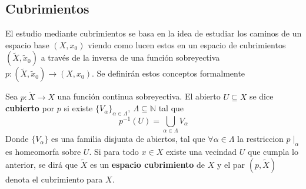 \subsection{Cubrimientos}
El estudio mediante cubrimientos se basa en la idea de estudiar los
caminos de un espacio base \((X, x_0)\) viendo como lucen estos en
un espacio de cubrimientos \((\tilde X, \tilde x_0)\) a través de la
inversa de una función sobreyectiva \(p : \left( \tilde X, \tilde x_0
\right) \to \left( X, x_0\right)\). Se definirán estos conceptos formalmente
\begin{definicion} \label{def:cubierta}
Sea \(p : \tilde{X} \to X\) una función continua sobreyectiva. El
abierto \(U \subseteq X\) se dice \textbf{cubierto} por \(p\)
si existe \(\{V_\alpha\}_{\alpha \in \Lambda},\ \Lambda \subseteq
\mathbb N\) tal que
\[ p^{-1} (U) = \bigcup_{\alpha \in \Lambda} V_\alpha \]
Donde \(\{V_\alpha\}\) es una familia disjunta de abiertos, tal que
\(\forall \alpha \in \Lambda\) la restriccion \( p \mid_{\alpha}\) es
homeomorfa sobre \(U\). Si para todo \(x \in X\) existe una vecindad
\(U\) que cumpla lo anterior, se dirá que \(\tilde{X}\) es un
\textbf{espacio cubrimiento} de \(X\) y el par \((p,\tilde X)\) denota
el cubrimiento para \(X\).
\end{definicion}

